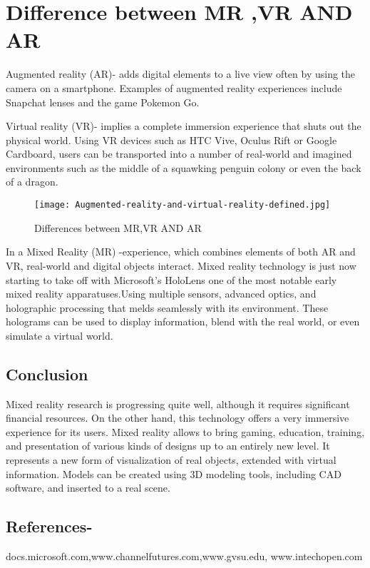 \documentclass[11pt]{article}
\begin{document}
\section{\textbf{Difference between MR ,VR AND AR}}

Augmented reality (AR)- adds digital elements to a live view often by using the camera on a smartphone. Examples of augmented reality experiences include Snapchat lenses and the game Pokemon Go. 


Virtual reality (VR)- implies a complete immersion experience that shuts out the physical world. Using VR devices such as HTC Vive, Oculus Rift or Google Cardboard, users can be transported into a number of real-world and imagined environments such as the middle of a squawking penguin colony or even the back of a dragon.\begin{figure}[h]
\centering \texttt{[image: Augmented-reality-and-virtual-reality-defined.jpg]}
\caption{Differences between MR,VR AND AR}
\end{figure}

In a Mixed Reality (MR) -experience, which combines elements of both AR and VR, real-world and digital objects interact. Mixed reality technology is just now starting to take off with Microsoft’s HoloLens one of the most notable early mixed reality apparatuses.Using multiple sensors, advanced optics, and holographic processing that melds seamlessly with its environment. These holograms can be used to display information, blend with the real world, or even simulate a virtual world.




\subsection{Conclusion}
  Mixed reality research is progressing quite well, although it requires significant financial resources. On the other hand, this technology offers a very immersive experience for its users. Mixed reality allows to bring gaming, education, training, and presentation of various kinds of designs up to an entirely new level. It represents a new form of visualization of real objects, extended with virtual information. Models can be created using 3D modeling tools, including CAD software, and inserted to a real scene.
  
  
\subsection{References-}
docs.microsoft.com,www.channelfutures.com,www.gvsu.edu,
www.intechopen.com
 
\end{document}
